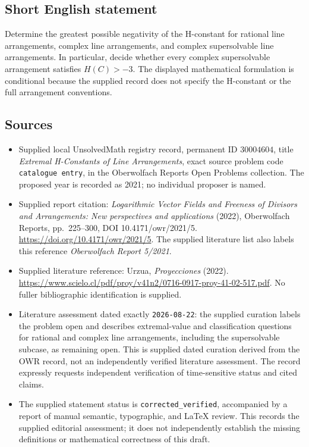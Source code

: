 \documentclass[11pt]{article}
\begin{document}
\subsection{Short English statement}
Determine the greatest possible negativity of the H-constant for rational line arrangements, complex line arrangements, and complex supersolvable line arrangements. In particular, decide whether every complex supersolvable arrangement satisfies \(H(C)>-3\). The displayed mathematical formulation is conditional because the supplied record does not specify the H-constant or the full arrangement conventions.
\subsection{Sources}
\begin{itemize}
\item Supplied local UnsolvedMath registry record, permanent ID \(30004604\), title \emph{Extremal H-Constants of Line Arrangements}, exact source problem code \texttt{catalogue entry}, in the Oberwolfach Reports Open Problems collection. The proposed year is recorded as 2021; no individual proposer is named.
\item Supplied report citation: \emph{Logarithmic Vector Fields and Freeness of Divisors and Arrangements: New perspectives and applications} (2022), Oberwolfach Reports, pp.~225--300, DOI 10.4171/owr/2021/5. \url{https://doi.org/10.4171/owr/2021/5}. The supplied literature list also labels this reference \emph{Oberwolfach Report 5/2021}.
\item Supplied literature reference: Urzua, \emph{Proyecciones} (2022). \url{https://www.scielo.cl/pdf/proy/v41n2/0716-0917-proy-41-02-517.pdf}. No fuller bibliographic identification is supplied.
\item Literature assessment dated exactly \texttt{2026-08-22}: the supplied curation labels the problem open and describes extremal-value and classification questions for rational and complex line arrangements, including the supersolvable subcase, as remaining open. This is supplied dated curation derived from the OWR record, not an independently verified literature assessment. The record expressly requests independent verification of time-sensitive status and cited claims.
\item The supplied statement status is \texttt{corrected\_verified}, accompanied by a report of manual semantic, typographic, and LaTeX review. This records the supplied editorial assessment; it does not independently establish the missing definitions or mathematical correctness of this draft.
\end{itemize}
\end{document}
